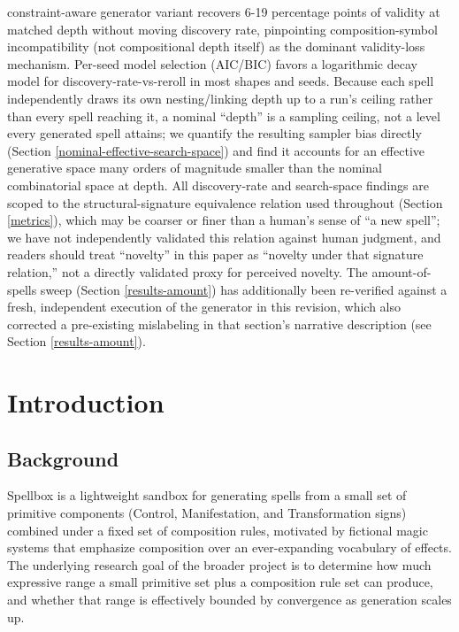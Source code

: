 \documentclass[]{article}
\begin{document}
constraint-aware generator variant recovers 6-19 percentage points of validity at matched depth without moving discovery rate, pinpointing composition-symbol incompatibility (not compositional depth itself) as the dominant validity-loss mechanism. Per-seed model selection (AIC/BIC) favors a logarithmic decay model for discovery-rate-vs-reroll in most shapes and seeds. Because each spell independently draws its own nesting/linking depth up to a run's ceiling rather than every spell reaching it, a nominal ``depth'' is a sampling ceiling, not a level every generated spell attains; we quantify the resulting sampler bias directly (Section \ref{nominal-effective-search-space}) and find it accounts for an effective generative space many orders of magnitude smaller than the nominal combinatorial space at depth. All discovery-rate and search-space findings are scoped to the structural-signature equivalence relation used throughout (Section \ref{metrics}), which may be coarser or finer than a human's sense of ``a new spell''; we have not independently validated this relation against human judgment, and readers should treat ``novelty'' in this paper as ``novelty under that signature relation,'' not a directly validated proxy for perceived novelty. The amount-of-spells sweep (Section \ref{results-amount}) has additionally been re-verified against a fresh, independent execution of the generator in this revision, which also corrected a pre-existing mislabeling in that section's narrative description (see Section \ref{results-amount}).

    \section{Introduction}\label{introduction}

        \subsection{Background}\label{background}

        Spellbox is a lightweight sandbox for generating spells from a small set of primitive components (Control, Manifestation, and Transformation signs) combined under a fixed set of composition rules, motivated by fictional magic systems that emphasize composition over an ever-expanding vocabulary of effects. The underlying research goal of the broader project is to determine how much expressive range a small primitive set plus a composition rule set can produce, and whether that range is effectively bounded by convergence as generation scales up.
\end{document}
